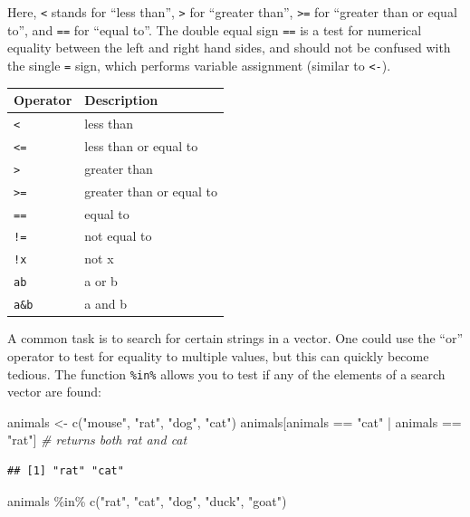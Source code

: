 \documentclass[
]{book}
\newenvironment{Shaded}{\begin{snugshade}}{\end{snugshade}}
\newcommand{\CommentTok}[1]{\textcolor[rgb]{0.56,0.35,0.01}{\textit{#1}}}
\newcommand{\FunctionTok}[1]{\textcolor[rgb]{0.00,0.00,0.00}{#1}}
\newcommand{\NormalTok}[1]{#1}
\newcommand{\OtherTok}[1]{\textcolor[rgb]{0.56,0.35,0.01}{#1}}
\newcommand{\SpecialCharTok}[1]{\textcolor[rgb]{0.00,0.00,0.00}{#1}}
\newcommand{\StringTok}[1]{\textcolor[rgb]{0.31,0.60,0.02}{#1}}
\begin{document}
Here, \texttt{\textless{}} stands for ``less than'', \texttt{\textgreater{}} for ``greater than'', \texttt{\textgreater{}=} for ``greater than or equal to'', and \texttt{==} for ``equal to''. The double equal sign \texttt{==} is a test for numerical equality between the left and right hand sides, and should not be confused with the single \texttt{=} sign, which performs variable assignment (similar to \texttt{\textless{}-}).

\begin{longtable}[]{@{}ll@{}}
\toprule
Operator & Description \\
\midrule
\endhead
\texttt{\textless{}} & less than \\
\texttt{\textless{}=} & less than or equal to \\
\texttt{\textgreater{}} & greater than \\
\texttt{\textgreater{}=} & greater than or equal to \\
\texttt{==} & equal to \\
\texttt{!=} & not equal to \\
\texttt{!x} & not x \\
\texttt{a\textbar{}b} & a or b \\
\texttt{a\&b} & a and b \\
\bottomrule
\end{longtable}

A common task is to search for certain strings in a vector. One could use the ``or'' operator \textbar{} to test for equality to multiple values, but this can quickly become tedious. The function \texttt{\%in\%} allows you to test if any of the elements of a search vector are found:

\begin{Shaded}
\begin{Highlighting}[]
\NormalTok{animals }\OtherTok{\textless{}{-}} \FunctionTok{c}\NormalTok{(}\StringTok{"mouse"}\NormalTok{, }\StringTok{"rat"}\NormalTok{, }\StringTok{"dog"}\NormalTok{, }\StringTok{"cat"}\NormalTok{)}
\NormalTok{animals[animals }\SpecialCharTok{==} \StringTok{"cat"} \SpecialCharTok{|}\NormalTok{ animals }\SpecialCharTok{==} \StringTok{"rat"}\NormalTok{] }\CommentTok{\# returns both rat and cat}
\end{Highlighting}
\end{Shaded}

\begin{verbatim}
## [1] "rat" "cat"
\end{verbatim}

\begin{Shaded}
\begin{Highlighting}[]
\NormalTok{animals }\SpecialCharTok{\%in\%} \FunctionTok{c}\NormalTok{(}\StringTok{"rat"}\NormalTok{, }\StringTok{"cat"}\NormalTok{, }\StringTok{"dog"}\NormalTok{, }\StringTok{"duck"}\NormalTok{, }\StringTok{"goat"}\NormalTok{)}
\end{Highlighting}
\end{Shaded}
\end{document}
